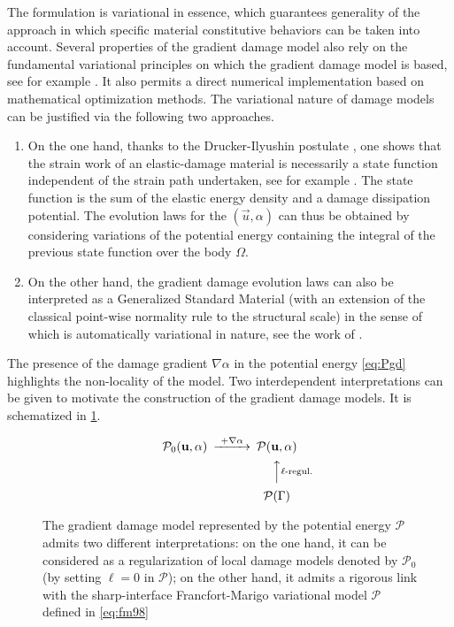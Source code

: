The formulation is variational in essence, which guarantees generality of the approach in which specific material constitutive behaviors can be taken into account. Several properties of the gradient damage model also rely on the fundamental variational principles on which the gradient damage model is based, see for example \cite{SicsicMarigo:2013,SicsicMarigoMaurini:2013}. It also permits a direct numerical implementation based on mathematical optimization methods. The variational nature of damage models can be justified via the following two approaches.
\begin{enumerate}
\item On the one hand, thanks to the Drucker-Ilyushin postulate \cite{Marigo:2002}, one shows that the strain work of an elastic-damage material is necessarily a state function independent of the strain path undertaken, see for example \cite{PhamMarigo:2010}. The state function is the sum of the elastic energy density and a damage dissipation potential. The evolution laws for the $(\vec{u},\alpha)$ can thus be obtained by considering variations of the potential energy containing the integral of the previous state function over the body $\Omega$.

\item On the other hand, the gradient damage evolution laws can also be interpreted as a Generalized Standard Material (with an extension of the classical point-wise normality rule to the structural scale) in the sense of \cite{Halphen:1975aa} which is automatically variational in nature, see the work of \cite{LorentzAndrieux:1999,LorentzBenallal:2005}.
\end{enumerate}

The presence of the damage gradient $\nabla\alpha$ in the potential energy \eqref{eq:Pgd} highlights the non-locality of the model. Two interdependent interpretations can be given to motivate the construction of the gradient damage models. It is schematized in \cref{fig:twointerpretationdamage}.
\begin{figure}[htbp]
\centering
\[
\begin{CD}
\mathcal{P}_0(\vec{u},\alpha) @>\text{+$\nabla\alpha$}>> \mathcal{P}(\vec{u},\alpha) \\
@. @AA\text{$\ell$-regul.}A \\
@. \mathcal{P}(\Gamma)
\end{CD}
\]
\caption{The gradient damage model represented by the potential energy $\mathcal{P}$ admits two different interpretations: on the one hand, it can be considered as a regularization of local damage models  denoted by $\mathcal{P}_0$ (by setting $\ell=0$ in $\mathcal{P}$); on the other hand, it admits a rigorous link with the sharp-interface Francfort-Marigo variational model $\mathcal{P}$ defined in \eqref{eq:fm98}} \label{fig:twointerpretationdamage}
\end{figure}

